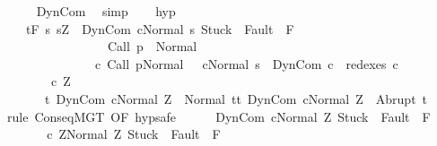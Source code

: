 \begin{isabellebody}
\ \ \ \ \isamarkupfalse%
\ DynCom\ \isamarkupfalse%
\ simp\isanewline
\ \ \isamarkupfalse%
\ hyp{\isacharprime}{\isacharcolon}\isanewline
\ \ \ \ {\isachardoublequoteopen}{\isasymGamma}{\isacharcomma}{\isasymTheta}{\isasymturnstile}\isactrlsub t\isactrlbsub {\isacharslash}F\isactrlesub \ {\isacharbraceleft}s{\isachardot}\ s{\isacharequal}Z\ {\isasymand}\ {\isasymGamma}{\isasymturnstile}{\isasymlangle}DynCom\ c{\isacharcomma}Normal\ s{\isasymrangle}\ {\isasymRightarrow}{\isasymnotin}{\isacharparenleft}{\isacharbraceleft}Stuck{\isacharbraceright}\ {\isasymunion}\ Fault\ {\isacharbackquote}\ {\isacharparenleft}{\isacharminus}F{\isacharparenright}{\isacharparenright}\ {\isasymand}\ \isanewline
\ \ \ \ \ \ \ \ \ \ \ \ \ \ \ \ \ {\isasymGamma}{\isasymturnstile}Call\ p\ {\isasymdown}\ Normal\ {\isasymsigma}\ {\isasymand}\isanewline
\ \ \ \ \ \ \ \ \ \ \ \ \ \ \ {\isacharparenleft}{\isasymexists}c{\isacharprime}{\isachardot}\ {\isasymGamma}{\isasymturnstile}{\isacharparenleft}Call\ p{\isacharcomma}Normal\ {\isasymsigma}{\isacharparenright}\ {\isasymrightarrow}\isactrlsup {\isacharplus}\ {\isacharparenleft}c{\isacharprime}{\isacharcomma}Normal\ s{\isacharparenright}\ {\isasymand}\ DynCom\ c\ {\isasymin}\ redexes\ c{\isacharprime}{\isacharparenright}{\isacharbraceright}\isanewline
\ \ \ \ \ \ \ \ {\isacharparenleft}c\ Z{\isacharparenright}\ \isanewline
\ \ \ \ \ \ \ {\isacharbraceleft}t{\isachardot}\ {\isasymGamma}{\isasymturnstile}{\isasymlangle}DynCom\ c{\isacharcomma}Normal\ Z{\isasymrangle}\ {\isasymRightarrow}\ Normal\ t{\isacharbraceright}{\isacharcomma}{\isacharbraceleft}t{\isachardot}\ {\isasymGamma}{\isasymturnstile}{\isasymlangle}DynCom\ c{\isacharcomma}Normal\ Z{\isasymrangle}\ {\isasymRightarrow}\ Abrupt\ t{\isacharbraceright}{\isachardoublequoteclose}\isanewline
\ \ \isamarkupfalse%
\ {\isacharparenleft}rule\ ConseqMGT\ {\isacharbrackleft}OF\ hyp{\isacharbrackright}{\isacharcomma}safe{\isacharparenright}\isanewline
\ \ \ \ \isamarkupfalse%
\ {\isachardoublequoteopen}{\isasymGamma}{\isasymturnstile}{\isasymlangle}DynCom\ c{\isacharcomma}Normal\ Z{\isasymrangle}\ {\isasymRightarrow}{\isasymnotin}{\isacharparenleft}{\isacharbraceleft}Stuck{\isacharbraceright}\ {\isasymunion}\ Fault\ {\isacharbackquote}\ {\isacharparenleft}{\isacharminus}F{\isacharparenright}{\isacharparenright}{\isachardoublequoteclose}\isanewline
\ \ \ \ \isamarkupfalse%
\ \isamarkupfalse%
\ {\isachardoublequoteopen}{\isasymGamma}{\isasymturnstile}{\isasymlangle}c\ Z{\isacharcomma}Normal\ Z{\isasymrangle}\ {\isasymRightarrow}{\isasymnotin}{\isacharparenleft}{\isacharbraceleft}Stuck{\isacharbraceright}\ {\isasymunion}\ Fault\ {\isacharbackquote}\ {\isacharparenleft}{\isacharminus}F{\isacharparenright}{\isacharparenright}{\isachardoublequoteclose}\isanewline

\end{isabellebody}
